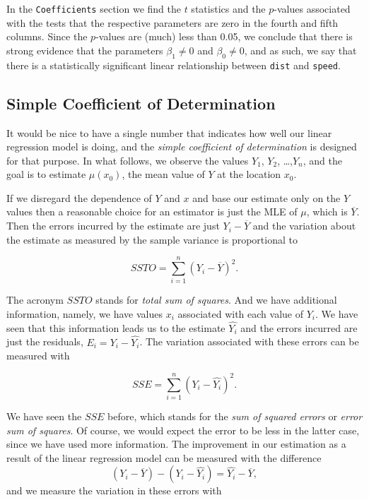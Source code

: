 \documentclass[]{book}
\numberwithin{equation}{chapter}
\numberwithin{figure}{chapter}
\theoremstyle{plain}
\theoremstyle{definition}
\theoremstyle{remark}
\theoremstyle{definition}
\theoremstyle{definition}
\theoremstyle{remark}
\begin{document}
In the \texttt{Coefficients} section we find the \(t\) statistics and
the \(p\)-values associated with the tests that the respective
parameters are zero in the fourth and fifth columns. Since the
\(p\)-values are (much) less than 0.05, we conclude that there is strong
evidence that the parameters \(\beta_{1}\neq0\) and \(\beta_{0}\neq0\),
and as such, we say that there is a statistically significant linear
relationship between \texttt{dist} and \texttt{speed}.

\subsection{Simple Coefficient of
Determination}\label{simple-coefficient-of-determination}

It would be nice to have a single number that indicates how well our
linear regression model is doing, and the \emph{simple coefficient of
determination} is designed for that purpose. In what follows, we observe
the values \(Y_{1}\), \(Y_{2}\), \ldots{},\(Y_{n}\), and the goal is to
estimate \(\mu(x_{0})\), the mean value of \(Y\) at the location
\(x_{0}\).

If we disregard the dependence of \(Y\) and \(x\) and base our estimate
only on the \(Y\) values then a reasonable choice for an estimator is
just the MLE of \(\mu\), which is \(\overline{Y}\). Then the errors
incurred by the estimate are just \(Y_{i}-\overline{Y}\) and the
variation about the estimate as measured by the sample variance is
proportional to

\begin{equation}
SSTO=\sum_{i=1}^{n}(Y_{i}-\overline{Y})^{2}.
\end{equation}

The acronym \(SSTO\) stands for \emph{total sum of squares}. And we have
additional information, namely, we have values \(x_{i}\) associated with
each value of \(Y_{i}\). We have seen that this information leads us to
the estimate \(\hat{Y_{i}}\) and the errors incurred are just the
residuals, \(E_{i}=Y_{i}-\hat{Y_{i}}\). The variation associated with
these errors can be measured with

\begin{equation}
SSE=\sum_{i=1}^{n}(Y_{i}-\hat{Y_{i}})^{2}.
\end{equation}

We have seen the \(SSE\) before, which stands for the \emph{sum of
squared errors} or \emph{error sum of squares}. Of course, we would
expect the error to be less in the latter case, since we have used more
information. The improvement in our estimation as a result of the linear
regression model can be measured with the difference \[
(Y_{i}-\overline{Y})-(Y_{i}-\hat{Y_{i}})=\hat{Y_{i}}-\overline{Y}, \]
and we measure the variation in these errors with
\end{document}
